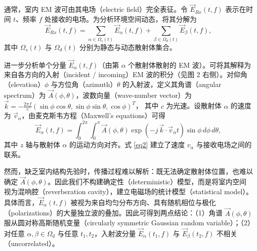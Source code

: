 \documentclass[UTF8,twocolumn]{ctexart}
\begin{document}
通常，室内 EM 波可由其电场（electric field）完全表征。令 $\vec{E}_{Rx}(t,f)$ 表示在时间 $t$、频率 $f$ 处接收的电场。为分析环境空间动态，将其分解为
\begin{equation}
\vec{E}_{Rx}(t,f)=\sum_{\alpha\in\Omega_s(t)}\vec{E}_{\alpha}(t,f)+\sum_{\beta\in\Omega_d(t)}\vec{E}_{\beta}(t,f),
\label{eq1}
\end{equation}
其中 $\Omega_s(t)$ 与 $\Omega_d(t)$ 分别为静态与动态散射体集合。

进一步分析单个分量 $\vec{E}_{\alpha}(t,f)$（由第 $\alpha$ 个散射体散射的 EM 波）。可将其解释为来自各方向的入射（incident / incoming）EM 波的积分（见图 2 右侧）。对仰角（elevation）$\phi$ 与方位角（azimuth）$\theta$ 的入射波，定义其角谱（angular spectrum）为 $\vec{A}(\phi,\theta)$，波数向量（wave-number vector）为
$\vec{k}=-\frac{2\pi f}{c}(\sin\phi\cos\theta,\sin\phi\sin\theta,\cos\phi)^{T}$，
其中 $c$ 为光速。设散射体 $\alpha$ 的速度为 $\vec{v}_{\alpha}$，由麦克斯韦方程（Maxwell's equations）\cite{ref38}可得
\begin{equation}
\vec{E}_{\alpha}(t,f)=\int_{0}^{2\pi}\int_{0}^{\pi}\vec{A}(\phi,\theta)\exp\!\left(-j\,\vec{k}\cdot\vec{v}_{\alpha}t\right)\sin\phi\,d\phi\,d\theta,
\label{eq2}
\end{equation}
其中 $z$ 轴与散射体 $\alpha$ 的运动方向对齐。式 \eqref{eq2} 建立了速度 $v_{\alpha}$ 与接收电场之间的联系。

然而，缺乏室内结构先验时，传播过程难以解析：既无法确定散射体位置，也难以确定 $\vec{A}(\phi,\theta)$。因此我们不构建确定性（deterministic）模型，而是将室内空间视为混响腔（reverberation cavity）\cite{ref38}，建立电磁场的统计模型（statistical model）。具体而言，$\vec{E}_{\alpha}(t,f)$ 被视为来自均匀分布方向、具有随机相位与极化（polarizations）的大量独立波的叠加。因此可得到两点结论：（1）角谱 $\vec{A}(\phi,\theta)$ 服从圆对称高斯随机变量（circularly symmetric Gaussian random variable）\cite{ref39}；（2）对任意 $\alpha,\beta\in\Omega_d$ 与任意 $t_1,t_2$，入射波分量 $\vec{E}_{\alpha}(t_1,f)$ 与 $\vec{E}_{\beta}(t_2,f)$ 不相关（uncorrelated）。
\end{document}
